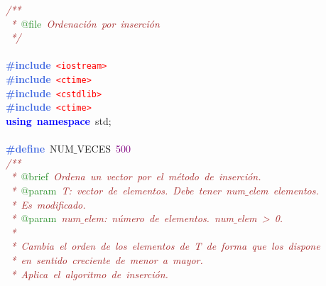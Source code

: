 \noindent
\mbox{}\textit{\textcolor{Brown}{/**}} \\
\mbox{}\textit{\textcolor{Brown}{\ *\ }}\textcolor{ForestGreen}{@file}\textit{\textcolor{Brown}{\ Ordenación\ por\ inserción}} \\
\mbox{}\textit{\textcolor{Brown}{\ */}} \\
\mbox{} \\
\mbox{}\textbf{\textcolor{RoyalBlue}{\#include}}\ \texttt{\textcolor{Red}{\textless{}iostream\textgreater{}}} \\
\mbox{}\textbf{\textcolor{RoyalBlue}{\#include}}\ \texttt{\textcolor{Red}{\textless{}ctime\textgreater{}}} \\
\mbox{}\textbf{\textcolor{RoyalBlue}{\#include}}\ \texttt{\textcolor{Red}{\textless{}cstdlib\textgreater{}}} \\
\mbox{}\textbf{\textcolor{RoyalBlue}{\#include}}\ \texttt{\textcolor{Red}{\textless{}ctime\textgreater{}}} \\
\mbox{}\textbf{\textcolor{Blue}{using}}\ \textbf{\textcolor{Blue}{namespace}}\ std\textcolor{BrickRed}{;} \\
\mbox{} \\
\mbox{}\textbf{\textcolor{RoyalBlue}{\#define}}\ NUM$\_$VECES\ \textcolor{Purple}{500} \\
\mbox{}\textit{\textcolor{Brown}{/**}} \\
\mbox{}\textit{\textcolor{Brown}{\ *\ }}\textcolor{ForestGreen}{@brief}\textit{\textcolor{Brown}{\ Ordena\ un\ vector\ por\ el\ método\ de\ inserción.}} \\
\mbox{}\textit{\textcolor{Brown}{\ *\ }}\textcolor{ForestGreen}{@param}\textit{\textcolor{Brown}{\ T:\ vector\ de\ elementos.\ Debe\ tener\ num$\_$elem\ elementos.}} \\
\mbox{}\textit{\textcolor{Brown}{\ *\ Es\ modificado.}} \\
\mbox{}\textit{\textcolor{Brown}{\ *\ }}\textcolor{ForestGreen}{@param}\textit{\textcolor{Brown}{\ num$\_$elem:\ número\ de\ elementos.\ num$\_$elem\ \textgreater{}\ 0.}} \\
\mbox{}\textit{\textcolor{Brown}{\ *\ }} \\
\mbox{}\textit{\textcolor{Brown}{\ *\ Cambia\ el\ orden\ de\ los\ elementos\ de\ T\ de\ forma\ que\ los\ dispone}} \\
\mbox{}\textit{\textcolor{Brown}{\ *\ en\ sentido\ creciente\ de\ menor\ a\ mayor.}} \\
\mbox{}\textit{\textcolor{Brown}{\ *\ Aplica\ el\ algoritmo\ de\ inserción.}} \\
